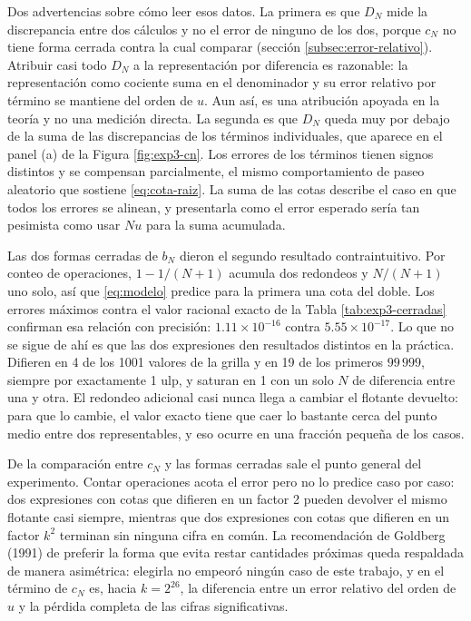 Dos advertencias sobre cómo leer esos datos. La primera es que $D_N$ mide la discrepancia entre dos
cálculos y no el error de ninguno de los dos, porque $c_N$ no tiene forma cerrada contra la cual
comparar (sección \ref{subsec:error-relativo}). Atribuir casi todo $D_N$ a la representación por
diferencia es razonable: la representación como cociente suma en el denominador y su error
relativo por término se mantiene del orden de $u$. Aun así, es una atribución apoyada en la teoría
y no una medición directa. La segunda es que $D_N$ queda muy por debajo de la suma de las
discrepancias de los términos individuales, que aparece en el panel (a) de la Figura
\ref{fig:exp3-cn}. Los errores de los términos tienen signos distintos y se compensan parcialmente, el mismo
comportamiento de paseo aleatorio que sostiene \eqref{eq:cota-raiz}. La suma de las cotas describe
el caso en que todos los errores se alinean, y presentarla como el error esperado sería tan
pesimista como usar $Nu$ para la suma acumulada.

Las dos formas cerradas de $b_N$ dieron el segundo resultado contraintuitivo. Por conteo de
operaciones, $1 - 1/(N+1)$ acumula dos redondeos y $N/(N+1)$ uno solo, así que \eqref{eq:modelo}
predice para la primera una cota del doble. Los errores máximos contra el valor racional exacto de
la Tabla \ref{tab:exp3-cerradas} confirman esa relación con precisión: $1.11 \times 10^{-16}$
contra $5.55 \times 10^{-17}$. Lo que no se sigue de ahí es que las dos expresiones den resultados
distintos en la práctica. Difieren en 4 de los 1001 valores de la grilla y en 19 de los primeros
$99\,999$, siempre por exactamente 1 ulp, y saturan en 1 con un solo $N$ de diferencia entre una y
otra. El redondeo adicional casi nunca llega a cambiar el flotante devuelto: para que lo cambie, el
valor exacto tiene que caer lo bastante cerca del punto medio entre dos representables, y eso ocurre
en una fracción pequeña de los casos.

De la comparación entre $c_N$ y las formas cerradas sale el punto general del experimento. Contar
operaciones acota el error pero no lo predice caso por caso: dos expresiones con cotas que difieren
en un factor 2 pueden devolver el mismo flotante casi siempre, mientras que dos expresiones con
cotas que difieren en un factor $k^{2}$ terminan sin ninguna cifra en común. La recomendación de
Goldberg (1991) de preferir la forma que evita restar cantidades próximas queda respaldada de manera
asimétrica: elegirla no empeoró ningún caso de este trabajo, y en el término de $c_N$ es, hacia
$k = 2^{26}$, la diferencia entre un error relativo del orden de $u$ y la pérdida completa de las
cifras significativas.

